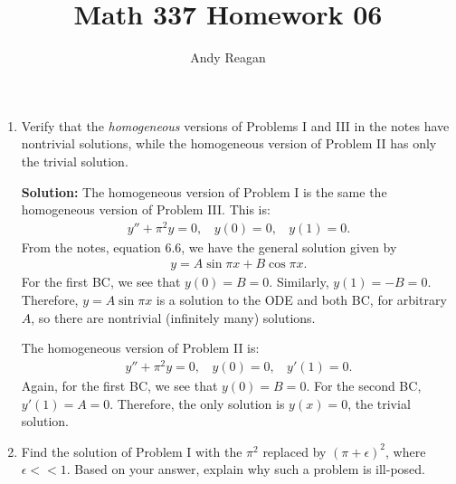 \documentclass[11pt]{article}
\author{Andy Reagan}
\title{Math 337 Homework 06}
\begin{document}
\maketitle

\begin{enumerate}

\item Verify that the {\em homogeneous} versions of Problems I and III in the notes have nontrivial solutions, while the homogeneous version of Problem II has only the trivial solution.

\bigskip
\textbf{Solution:} The homogeneous version of Problem I is the same the homogeneous version of Problem III. This is:
\begin{align*} y'' + \pi ^2 y = 0, ~~~~y(0) = 0, ~~~~y(1) = 0. \end{align*}
From the notes, equation 6.6, we have the general solution given by 
\begin{align*} y = A \sin \pi x + B\cos \pi x. \end{align*}
For the first BC, we see that $y(0) = B = 0$.
Similarly, $y(1) = -B = 0$.
Therefore, $y = A \sin \pi x$ is a solution to the ODE and both BC, for arbitrary $A$, so there are nontrivial (infinitely many) solutions.

The homogeneous version of Problem II is:
\begin{align*} y'' + \pi ^2 y = 0, ~~~~y(0) = 0, ~~~~y'(1) = 0. \end{align*}
Again, for the first BC, we see that $y(0) = B = 0$.
For the second BC, $y'(1) = A = 0$.
Therefore, the only solution is $y(x) = 0$, the trivial solution.


\bigskip
\item Find the solution of Problem I with the $\pi ^2$ replaced by $(\pi + \epsilon)^2$, where $\epsilon << 1$.
Based on your answer, explain why such a problem is ill-posed.



\end{enumerate}
\end{document}
